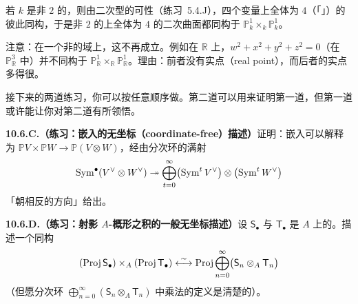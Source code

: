 若 $k$ 是\trCharacteristic{}非 $2$ 的\trAlgClosedField，则由二次型的可\trDiagonalize{}性（\mbox{练习~5.4.J}），四个变量上全体\trRank{}为 $4$（「\trFullRank」）的\trQuadraticForm{}彼此同构，于是\trCharacteristic{}非 $2$ 的\trAlgClosedField{}上全体\trRank{}为 $4$ 的二次曲面都同构于 $\mathbb{P}^1_k\times_k\mathbb{P}^1_k$。

注意：在一个非\trAlgClosed{}的域上，这不再成立。例如在 $\mathbb{R}$ 上，$w^2+x^2+y^2+z^2=0$（在 $\mathbb{P}^3_\mathbb{R}$ 中）并不同构于 $\mathbb{P}^1_\mathbb{R}\times_\mathbb{R}\mathbb{P}^1_\mathbb{R}$。理由：前者没有实点（real point），而后者的实点多得很。

接下来的两道练习，你可以按任意顺序做。第二道可以用来证明第一道，但第一道或许能让你对第二道有所领悟。

\textbf{10.6.C.（练习：\trSegre{}嵌入的无坐标（coordinate-free）描述）}\quad 证明：\trSegre{}嵌入可以解释为 $\mathbb{P}V\times\mathbb{P}W\to\mathbb{P}(V\otimes W)$，经由分次环的满射
\[
\operatorname{Sym}^\bullet(V^\vee\otimes W^\vee)\twoheadrightarrow\bigoplus_{t=0}^{\infty}\bigl(\operatorname{Sym}^t V^\vee\bigr)\otimes\bigl(\operatorname{Sym}^t W^\vee\bigr)
\]
「朝相反的方向」给出。

\textbf{10.6.D.（练习：射影 $A$-概形之积的一般无坐标描述）}\quad 设 $\mathsf{S}_\bullet$ 与 $\mathsf{T}_\bullet$ 是 $A$ 上\trFinitelyGenerated{}的\trGradedRing。描述一个同构
\[
(\operatorname{Proj} \mathsf{S}_\bullet)\times_A(\operatorname{Proj} \mathsf{T}_\bullet)\overset{\sim}{\longleftrightarrow}\operatorname{Proj}\bigoplus_{n=0}^{\infty}\bigl(\mathsf{S}_n\otimes_A\mathsf{T}_n\bigr)
\]
（但愿分次环 $\bigoplus_{n=0}^{\infty}(\mathsf{S}_n\otimes_A\mathsf{T}_n)$ 中乘法的定义是清楚的）。
